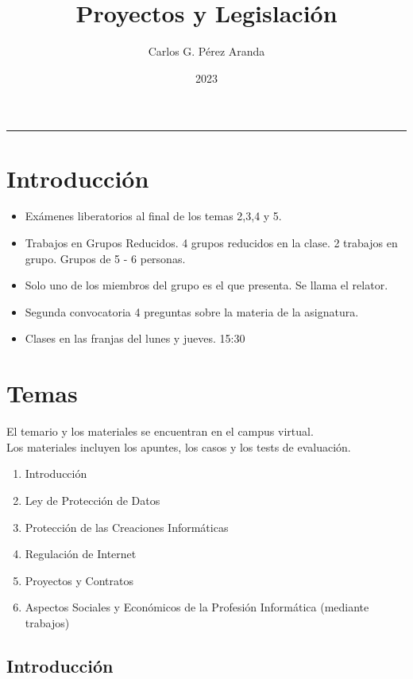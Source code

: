 \documentclass[spanish, 12pt, a4paper, twoside]{article}
\begin{document}
\title{Proyectos y Legislación}

\author{Carlos G. Pérez Aranda}
\date{2023}
\maketitle
{}


\hrule
\raggedright
\section{Introducción}
\begin{itemize}
\item Exámenes liberatorios al final de los temas 2,3,4 y 5.
\item Trabajos en Grupos Reducidos. 4 grupos reducidos en la clase. 2 trabajos en grupo. Grupos de 5 - 6 personas.
\item Solo uno de los miembros del grupo es el que presenta. Se llama el relator.
\item Segunda convocatoria 4 preguntas sobre la materia de la asignatura.
\item Clases en las franjas del lunes y jueves. 15:30
\end{itemize}

\section{Temas}

El temario y los materiales se encuentran en el campus virtual.\\
Los materiales incluyen los apuntes, los casos y los tests de evaluación.


\begin{enumerate}
    \item Introducción
    \item Ley de Protección de Datos
    \item Protección de las Creaciones Informáticas
    \item Regulación de Internet
    \item Proyectos y Contratos
    \item Aspectos Sociales y Económicos de la Profesión Informática (mediante trabajos)
\end{enumerate}

\subsection[short]{Introducción}
\end{document}
